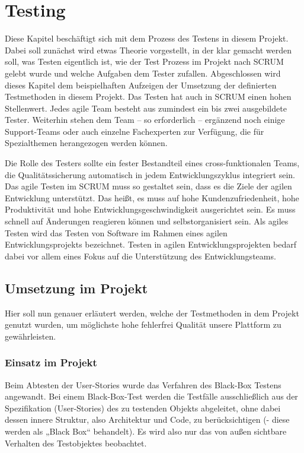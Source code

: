 \chapter{Testing}
\label{ch:testing}

Diese Kapitel beschäftigt sich mit dem Prozess des Testens in diesem Projekt. Dabei soll zunächst wird etwas Theorie vorgestellt, in der klar gemacht werden soll, was Testen eigentlich ist, wie der Test Prozess im Projekt nach SCRUM gelebt wurde und welche Aufgaben dem Tester zufallen. Abgeschlossen wird dieses Kapitel dem beispielhaften Aufzeigen der Umsetzung der definierten Testmethoden in diesem Projekt.
Das Testen hat auch in SCRUM einen hohen Stellenwert. Jedes agile Team besteht aus zumindest ein bis zwei ausgebildete Tester. Weiterhin stehen dem Team – so erforderlich – ergänzend noch einige Support-Teams oder auch einzelne Fachexperten zur Verfügung, die für Spezialthemen herangezogen werden können.


Die Rolle des Testers sollte ein fester Bestandteil eines cross-funktionalen Teams, die Qualitätssicherung automatisch in jedem Entwicklungszyklus integriert sein. Das agile Testen im SCRUM muss so gestaltet sein, dass es die Ziele der agilen Entwicklung unterstützt. Das heißt, es muss auf hohe Kundenzufriedenheit, hohe Produktivität und hohe Entwicklungsgeschwindigkeit ausgerichtet sein. Es muss schnell auf Änderungen reagieren können und selbstorganisiert sein.
Als agiles Testen wird das Testen von Software im Rahmen eines agilen Entwicklungsprojekts bezeichnet. Testen in agilen Entwicklungsprojekten bedarf dabei vor allem eines Fokus auf die Unterstützung des Entwicklungsteams.


\section{Umsetzung im Projekt}
\label{sec:UmsetzungTest}

Hier soll nun genauer erläutert werden, welche der Testmethoden in dem Projekt genutzt wurden, um möglichste hohe fehlerfrei Qualität unsere Plattform zu gewährleisten.


\subsection{Einsatz im Projekt}
\label{sub:UmsetzungTestGGUserStories}

Beim Abtesten der User-Stories wurde das Verfahren des Black-Box Testens angewandt. Bei einem Black-Box-Test werden die Testfälle ausschließlich aus der Spezifikation (User-Stories) des zu testenden Objekts abgeleitet, ohne dabei dessen innere Struktur, also Architektur und Code, zu berücksichtigen (- diese werden als „Black Box“ behandelt). Es wird also nur das von außen sichtbare Verhalten des Testobjektes beobachtet.

